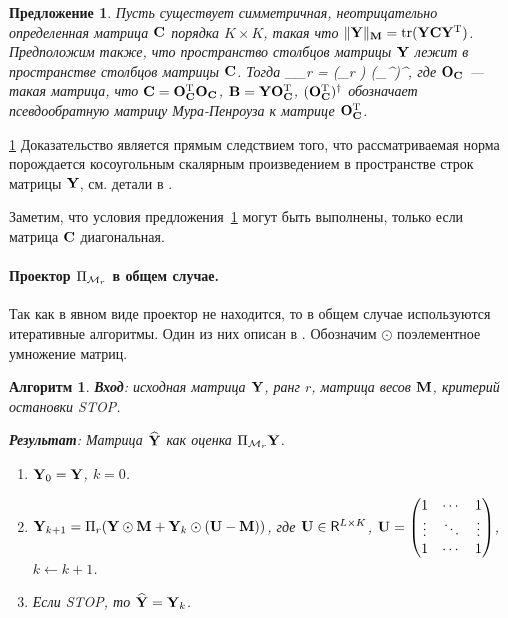 \documentclass[12pt,a4paper,fleqn,leqno]{article}
\DeclareMathOperator{\tr}{tr}
\newtheorem{proposition}{Предложение}
\newtheorem{algorithm}{Алгоритм}
\begin{document}
\begin{proposition}
\label{prop:projS}
Пусть существует симметричная, неотрицательно оп\-ре\-де\-лен\-ная матрица  $\mathbf{C}$ порядка $K \times K$,
такая что $\|\bfY\|_\bfM = \tr(\bfY \bfC \bfY^\rmT)$.
Предположим также, что пространство столбцов матрицы $\mathbf{Y}$ лежит в пространстве столбцов матрицы $\mathbf{C}$.
Тогда
\be
\label{eq:PiMr}
\Pi_{\calM_r} \bfY = (\Pi_r \bfB) (\bfO_\bfC^{\rmT})^\dagger,
\ee
где $\mathbf{O}_{\mathbf{C}}$ --- такая матрица, что $\mathbf{C} = \mathbf{O}_{\mathbf{C}}^{\mathrm{T}}\mathbf{O}_{\mathbf{C}}$,
$\mathbf{B} = \mathbf{Y} \mathbf{O}_{\mathbf{C}}^{\mathrm{T}}$, $(\mathbf{O}_{\mathbf{C}}^{\mathrm{T}})^\dagger$ обозначает псевдообратную матрицу Мура-Пенроуза к матрице $\mathbf{O}_{\mathbf{C}}^{\mathrm{T}}$.
\end{proposition}
\begin{proof5}{\ref{prop:projS}}
Доказательство является прямым следствием того, что рассматриваемая норма порождается косоугольным скалярным произведением в пространстве строк матрицы $\mathbf{Y}$, см. детали в \cite{Golyandina2013}.
\end{proof5}

\begin{remark}
Заметим, что условия предложения~\ref{prop:projS} могут быть выполнены, только если матрица $\mathbf{C}$ диагональная.
\end{remark}

\paragraph{Проектор $\Pi_{\mathcal{M}_r}$ в общем случае.}
Так как в явном виде проектор не находится, то в общем случае используются итеративные алгоритмы.
Один из них описан в \cite{Srebro2003}. Обозначим $\odot$ поэлементное умножение матриц.

\begin{algorithm}
\label{alg:weightedSVD}
\textbf{Вход}: исходная матрица $\mathbf{Y}$, ранг $r$, матрица весов $\mathbf{M}$,
критерий остановки STOP.

\textbf{Результат}:
Матрица $\widehat{\mathbf{Y}}$ как оценка $\Pi_{\mathcal{M}_r} \mathbf{Y}$.

\begin{enumerate}
\item
$\mathbf{Y}_0 = \mathbf{Y}$, $k=0$.
\item
$\mathbf{Y}_{k+1} = \Pi_r(\mathbf{Y} \odot \mathbf{M} + \mathbf{Y}_{k} \odot (\mathbf{U} -  \mathbf{M}))$, где
$\mathbf{U} \in \mathsf{R}^{L \times K}$,  $\mathbf{U} = \begin{pmatrix}
1 & \cdots & 1 \\
\vdots & \ddots & \vdots \\
1 & \cdots & 1
\end{pmatrix}$, $k\leftarrow k+1$.
\item
Если STOP, то $\widehat{\mathbf{Y}} = \mathbf{Y}_k$.
\end{enumerate}
\end{algorithm}
\end{document}
